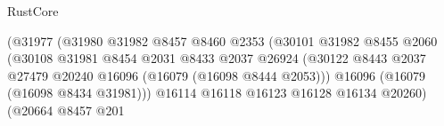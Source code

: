 \begin{lexlean}{RustCore}
\begin{coremodule}
                                                            (@31977
                                                              (@31980
                                                                @31982
                                                                @8457
                                                                @8460
                                                                @2353
                                                                (@30101
                                                                  @31982
                                                                  @8455
                                                                  @2060
                                                                  (@30108
                                                                    @31981
                                                                    @8454
                                                                    @2031
                                                                    @8433
                                                                    @2037
                                                                    @26924
                                                                    (@30122
                                                                      @8443
                                                                      @2037
                                                                      @27479
                                                                      @20240
                                                                      @16096
                                                                      (@16079 (@16098 @8444 @2053)))
                                                                    @16096
                                                                    (@16079 (@16098 @8434 @31981)))
                                                                  @16114
                                                                  @16118
                                                                  @16123
                                                                  @16128
                                                                  @16134
                                                                  @20260)
                                                                (@20664
                                                                  @8457
                                                                  @201

\end{coremodule}
\end{lexlean}
